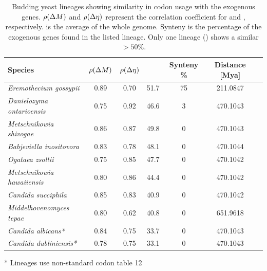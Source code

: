 \documentclass[fleqn,letterpaper]{article}
\begin{document}
\begin{table}
  \centering
  \caption{Budding yeast lineages showing similarity in codon usage with the exogenous genes.
  $\rho({\Delta M})$ and $\rho({\Delta \eta})$ represent the correlation coefficient for \DM and \DE, respectively.
  \GC is the average \GC of the whole genome.
  Synteny is the percentage of the exogenous genes found in the listed lineage.
  Only one lineage (\gossypii) shows a similar \GC $> 50 \%$.}
  \begin{threeparttable}
  	\begin{tabular}{lcccccc}
    		\hline
    		Species & $\rho({\Delta M})$ & $\rho({\Delta \eta})$ & \GC & Synteny \%&  Distance [Mya] \\ \hline 
    		\emph{Eremothecium gossypii}			& 0.89 & 0.70 & 51.7 & 75 & 211.0847 \\
    		\emph{Danielozyma ontarioensis}			& 0.75 & 0.92 & 46.6 & 3   & 470.1043 \\
    		\emph{Metschnikowia shivogae}			& 0.86 & 0.87 & 49.8 & 0   & 470.1043 \\
    		\emph{Babjeviella inositovora}			& 0.83 & 0.78 & 48.1 & 0   & 470.1044 \\
    		\emph{Ogataea zsoltii}					& 0.75 & 0.85 & 47.7 & 0   & 470.1042 \\ 
    		\emph{Metschnikowia hawaiiensis}		& 0.80 & 0.86 & 44.4 & 0   & 470.1042 \\
    		\emph{Candida succiphila}	       			& 0.85 & 0.83 & 40.9 & 0   & 470.1042 \\ 
    		\emph{Middelhovenomyces tepae}		& 0.80 & 0.62 & 40.8 & 0   & 651.9618 \\ 
    		\emph{Candida albicans*}		   		& 0.84 & 0.75 & 33.7 & 0   & 470.1043 \\
   		\emph{Candida dubliniensis*}               		& 0.78 & 0.75 & 33.1 & 0   & 470.1043 \\ \hline
  	\end{tabular}
  	\begin{tablenotes}
    		\item[*] Lineages use non-standard codon table 12
 	 \end{tablenotes}
  \end{threeparttable}  
  \label{tab:source}
\end{table}
\end{document}
